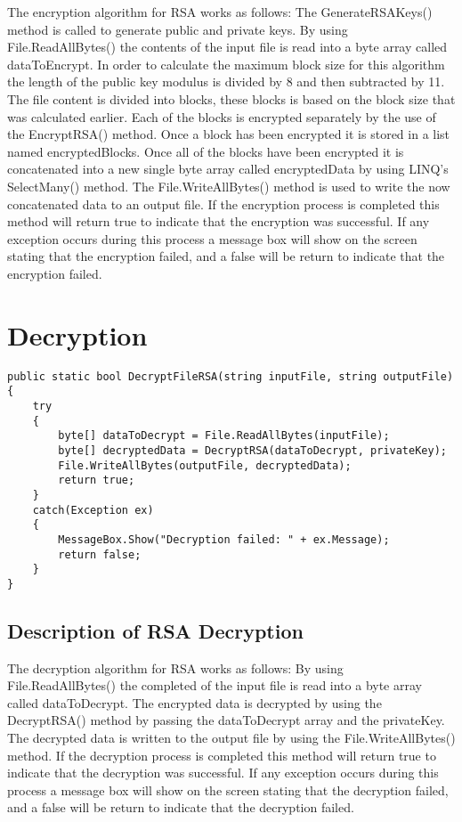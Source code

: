 \documentclass[a4paper,oneside,11pt]{book}
\begin{document}
The encryption algorithm for RSA works as follows:
The GenerateRSAKeys() method is called to generate public and private keys. By using File.ReadAllBytes() the contents of the input file is read into a byte array called dataToEncrypt. In order to calculate the maximum block size for this algorithm the length of the public key modulus is divided by 8 and then subtracted by 11. The file content is divided into blocks, these blocks is based on the block size that was calculated earlier. Each of the blocks is encrypted separately by the use of the EncryptRSA() method. Once a block has been encrypted it is stored in a list named encryptedBlocks. Once all of the blocks have been encrypted it is concatenated into a new single byte array called encryptedData by using LINQ's SelectMany() method. The File.WriteAllBytes() method is used to write the now concatenated data to an output file. If the encryption process is completed this method will return true to indicate that the encryption was successful. If any exception occurs during this process a message box will show on the screen stating that the encryption failed, and a false will be return to indicate that the encryption failed.

\section{Decryption}
\begin{lstlisting}[language=Csh, caption={Code for RSA Decryption}]
public static bool DecryptFileRSA(string inputFile, string outputFile)
{
    try
    {
        byte[] dataToDecrypt = File.ReadAllBytes(inputFile);
        byte[] decryptedData = DecryptRSA(dataToDecrypt, privateKey);
        File.WriteAllBytes(outputFile, decryptedData);
        return true;
    }
    catch(Exception ex)
    {
        MessageBox.Show("Decryption failed: " + ex.Message);
        return false;      
    }
}
\end{lstlisting}

\pagestyle{plain}
\subsection{Description of RSA Decryption}

The decryption algorithm for RSA works as follows:
By using File.ReadAllBytes() the completed of the input file is read into a byte array called dataToDecrypt. The encrypted data is decrypted by using the DecryptRSA() method by passing the dataToDecrypt array and the privateKey. The decrypted data is written to the output file by using the File.WriteAllBytes() method. If the decryption process is completed this method will return true to indicate that the decryption was successful. If any exception occurs during this process a message box will show on the screen stating that the decryption failed, and a false will be return to indicate that the decryption failed.
\end{document}

